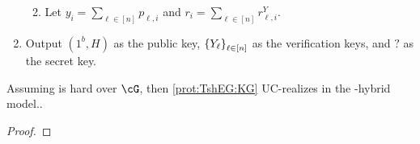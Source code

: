 \begin{protocol}
\begin{enumerate}
\begin{enumerate}
				
				
				
				
				\item Let  $y_i = \sum_{\ell\in [n]} p_{\ell,i}$  and $r_i = \sum_{\ell\in [n]} r^Y_{\ell,i}$.
				
				
				
			\end{enumerate}
			
			
			
			\item Output $(1^b,H)$ as the public key, $\set{Y_\ell}_{\ell \in [n]}$ as the verification keys, and $?$ as the secret key.
		\end{enumerate}
	
	
\end{protocol}


\begin{theorem}\label{thm:TshEG:KG}
	Assuming \DDH is hard over $\cG$, then \cref{prot:TshEG:KG} UC-realizes \tdKg in the \randomH-hybrid model..
\end{theorem}
\begin{proof}
\end{proof}

